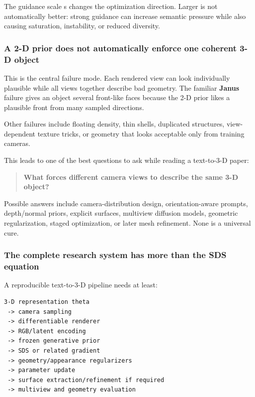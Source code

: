 The guidance scale s changes the optimization direction. Larger is not automatically better: strong guidance can increase semantic pressure while also causing saturation, instability, or reduced diversity.

\subsubsection{A 2-D prior does not automatically enforce one coherent 3-D object}\label{a-2-d-prior-does-not-automatically-enforce-one-coherent-3-d-object}

This is the central failure mode. Each rendered view can look individually plausible while all views together describe bad geometry. The familiar \textbf{Janus} failure gives an object several front-like faces because the 2-D prior likes a plausible front from many sampled directions.

Other failures include floating density, thin shells, duplicated structures, view-dependent texture tricks, or geometry that looks acceptable only from training cameras.

This leads to one of the best questions to ask while reading a text-to-3-D paper:

\begin{quote}
\textbf{What forces different camera views to describe the same 3-D object?}
\end{quote}

Possible answers include camera-distribution design, orientation-aware prompts, depth/normal priors, explicit surfaces, multiview diffusion models, geometric regularization, staged optimization, or later mesh refinement. None is a universal cure.

\subsubsection{The complete research system has more than the SDS equation}\label{the-complete-research-system-has-more-than-the-sds-equation}

A reproducible text-to-3-D pipeline needs at least:

\begin{verbatim}
3-D representation theta
 -> camera sampling
 -> differentiable renderer
 -> RGB/latent encoding
 -> frozen generative prior
 -> SDS or related gradient
 -> geometry/appearance regularizers
 -> parameter update
 -> surface extraction/refinement if required
 -> multiview and geometry evaluation
\end{verbatim}

